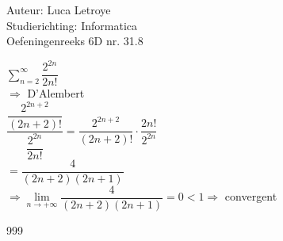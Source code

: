 \documentclass[a4paper]{article}
\begin{document}
  
\noindent \large Auteur: Luca Letroye \\
\noindent \large Studierichting: Informatica\\
\noindent \large Oefeningenreeks 6D nr. 31.8

\medskip
\normalsize

$ \displaystyle\sum_{n=2}^{\infty} \dfrac{2^{2n}}{2n!} $\\

$\Rightarrow $ D'Alembert\\

$\dfrac{\dfrac{2^{2n+2}}{(2n+2)!}}{\dfrac{2^{2n}}{2n!}} = \dfrac{2^{2n+2}}{(2n+2)!}\cdot \dfrac{2n!}{2^{2n}}$\\

$= \dfrac{4}{(2n+2)(2n+1)} $\\

$\Rightarrow \lim\limits_{n\rightarrow +\infty} \dfrac{4}{(2n+2)(2n+1)}  = 0 < 1 \Rightarrow $ convergent\\






\begin{thebibliography}{999}
\end{thebibliography}
\end{document}
